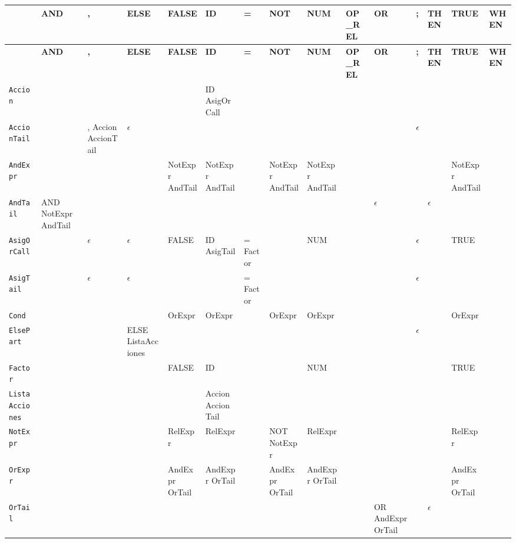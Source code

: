\begin{landscape}
\begin{longtable}{|l|l|l|l|l|l|l|l|l|l|l|l|l|l|l|}
\hline
\textbf{} & \textbf{AND} & \textbf{,} & \textbf{ELSE} & \textbf{FALSE} & \textbf{ID} & \textbf{=} & \textbf{NOT} & \textbf{NUM} & \textbf{OP\_REL} & \textbf{OR} & \textbf{;} & \textbf{THEN} & \textbf{TRUE} & \textbf{WHEN} \\ 
\hline
\endfirsthead
\hline
\textbf{} & \textbf{AND} & \textbf{,} & \textbf{ELSE} & \textbf{FALSE} & \textbf{ID} & \textbf{=} & \textbf{NOT} & \textbf{NUM} & \textbf{OP\_REL} & \textbf{OR} & \textbf{;} & \textbf{THEN} & \textbf{TRUE} & \textbf{WHEN} \\ 
\hline
\endhead
\hline
\endfoot
\texttt{Accion} &  &  &  &  & ID AsigOrCall &  &  &  &  &  &  &  &  &  \\ 
\hline
\texttt{AccionTail} &  & , Accion AccionTail & $\epsilon$ &  &  &  &  &  &  &  & $\epsilon$ &  &  &  \\ 
\hline
\texttt{AndExpr} &  &  &  & NotExpr AndTail & NotExpr AndTail &  & NotExpr AndTail & NotExpr AndTail &  &  &  &  & NotExpr AndTail &  \\ 
\hline
\texttt{AndTail} & AND NotExpr AndTail &  &  &  &  &  &  &  &  & $\epsilon$ &  & $\epsilon$ &  &  \\ 
\hline
\texttt{AsigOrCall} &  & $\epsilon$ & $\epsilon$ & FALSE & ID AsigTail & = Factor &  & NUM &  &  & $\epsilon$ &  & TRUE &  \\ 
\hline
\texttt{AsigTail} &  & $\epsilon$ & $\epsilon$ &  &  & = Factor &  &  &  &  & $\epsilon$ &  &  &  \\ 
\hline
\texttt{Cond} &  &  &  & OrExpr & OrExpr &  & OrExpr & OrExpr &  &  &  &  & OrExpr &  \\ 
\hline
\texttt{ElsePart} &  &  & ELSE ListaAcciones &  &  &  &  &  &  &  & $\epsilon$ &  &  &  \\ 
\hline
\texttt{Factor} &  &  &  & FALSE & ID &  &  & NUM &  &  &  &  & TRUE &  \\ 
\hline
\texttt{ListaAcciones} &  &  &  &  & Accion AccionTail &  &  &  &  &  &  &  &  &  \\ 
\hline
\texttt{NotExpr} &  &  &  & RelExpr & RelExpr &  & NOT NotExpr & RelExpr &  &  &  &  & RelExpr &  \\ 
\hline
\texttt{OrExpr} &  &  &  & AndExpr OrTail & AndExpr OrTail &  & AndExpr OrTail & AndExpr OrTail &  &  &  &  & AndExpr OrTail &  \\ 
\hline
\texttt{OrTail} &  &  &  &  &  &  &  &  &  & OR AndExpr OrTail &  & $\epsilon$ &  &  \\ 

\end{longtable}
\end{landscape}
